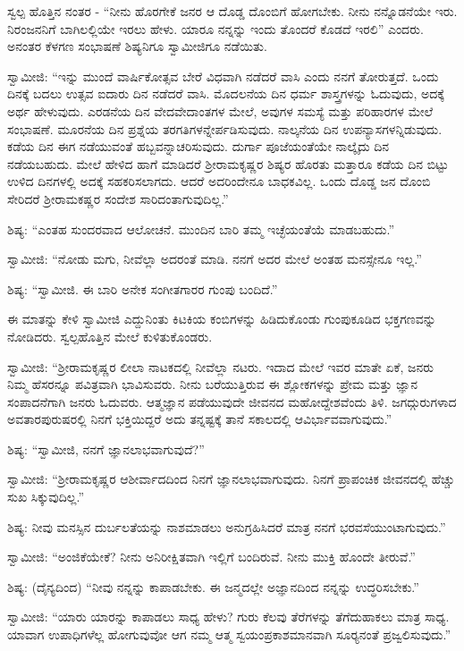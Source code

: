  ಸ್ವಲ್ಪ ಹೊತ್ತಿನ ನಂತರ - “ನೀನು ಹೊರಗೇಕೆ ಜನರ ಆ ದೊಡ್ಡ ದೊಂಬಿಗೆ ಹೋಗಬೇಕು. ನೀನು ನನ್ನೊಡನೆಯೇ ಇರು. ನಿರಂಜನನಿಗೆ ಬಾಗಿಲಲ್ಲಿಯೇ ಇರಲು ಹೇಳು. ಯಾರೂ ನನ್ನನ್ನು ಇಂದು ತೊಂದರೆ ಕೊಡದೆ ಇರಲಿ” ಎಂದರು. ಅನಂತರ ಕೆಳಗಣ ಸಂಭಾಷಣೆ ಶಿಷ್ಯನಿಗೂ ಸ್ವಾಮೀಜಿಗೂ ನಡೆಯಿತು. 

 ಸ್ವಾಮೀಜಿ: “ಇನ್ನು ಮುಂದೆ ವಾರ್ಷಿಕೋತ್ಸವ ಬೇರೆ ವಿಧವಾಗಿ ನಡೆದರೆ ವಾಸಿ ಎಂದು ನನಗೆ ತೋರುತ್ತದೆ. ಒಂದು ದಿನಕ್ಕೆ ಬದಲು ಉತ್ಸವ ಐದಾರು ದಿನ ನಡೆದರೆ ವಾಸಿ. ಮೊದಲನೆಯ ದಿನ ಧರ್ಮ ಶಾಸ್ತ್ರಗಳನ್ನು ಓದುವುದು, ಅದಕ್ಕೆ ಅರ್ಥ ಹೇಳುವುದು. ಎರಡನೆಯ ದಿನ ವೇದವೇದಾಂತಗಳ ಮೇಲೆ, ಅವುಗಳ ಸಮಸ್ಯೆ ಮತ್ತು ಪರಿಹಾರಗಳ ಮೇಲೆ ಸಂಭಾಷಣೆ. ಮೂರನೆಯ ದಿನ ಪ್ರಶ್ನೆಯ ತರಗತಿಗಳನ್ನೇರ್ಪಡಿಸುವುದು. ನಾಲ್ಕನೆಯ ದಿನ ಉಪನ್ಯಾಸಗಳನ್ನಿಡುವುದು. ಕಡೆಯ ದಿನ ಈಗ ನಡೆಯುವಂತೆ ಹಬ್ಬವನ್ನಾಚರಿಸುವುದು. ದುರ್ಗಾ ಪೂಜೆಯಂತೆಯೇ ನಾಲ್ಕೈದು ದಿನ ನಡೆಯಬಹುದು. ಮೇಲೆ ಹೇಳಿದ ಹಾಗೆ ಮಾಡಿದರೆ ಶ‍್ರೀರಾಮಕೃಷ್ಣರ ಶಿಷ್ಯರ ಹೊರತು ಮತ್ತಾರೂ ಕಡೆಯ ದಿನ ಬಿಟ್ಟು ಉಳಿದ ದಿನಗಳಲ್ಲಿ ಅದಕ್ಕೆ ಸಹಕರಿಸಲಾಗದು. ಆದರೆ ಅದರಿಂದೇನೂ ಬಾಧಕವಿಲ್ಲ. ಒಂದು ದೊಡ್ಡ ಜನ ದೊಂಬಿ ಸೇರಿದರೆ ಶ‍್ರೀರಾಮಕಷ್ಣರ ಸಂದೇಶ ಸಾರಿದಂತಾಗುವುದಿಲ್ಲ.” 

 ಶಿಷ್ಯ: “ಎಂತಹ ಸುಂದರವಾದ ಆಲೋಚನೆ. ಮುಂದಿನ ಬಾರಿ ತಮ್ಮ ಇಚ್ಛೆಯಂತೆಯೆ ಮಾಡಬಹುದು.” 

 ಸ್ವಾಮೀಜಿ: “ನೋಡು ಮಗು, ನೀವೆಲ್ಲಾ ಅದರಂತೆ ಮಾಡಿ. ನನಗೆ ಅದರ ಮೇಲೆ ಅಂತಹ ಮನಸ್ಸೇನೂ ಇಲ್ಲ.” 

 ಶಿಷ್ಯ: “ಸ್ವಾಮೀಜಿ. ಈ ಬಾರಿ ಅನೇಕ ಸಂಗೀತಗಾರರ ಗುಂಪು ಬಂದಿದೆ.” 

 ಈ ಮಾತನ್ನು ಕೇಳಿ ಸ್ವಾಮೀಜಿ ಎದ್ದುನಿಂತು ಕಿಟಕಿಯ ಕಂಬಿಗಳನ್ನು ಹಿಡಿದುಕೊಂಡು ಗುಂಪುಕೂಡಿದ ಭಕ್ತಗಣವನ್ನು ನೋಡಿದರು. ಸ್ವಲ್ಪಹೊತ್ತಿನ ಮೇಲೆ ಕುಳಿತುಕೊಂಡರು. 

 ಸ್ವಾಮೀಜಿ: “ಶ‍್ರೀರಾಮಕೃಷ್ಣರ ಲೀಲಾ ನಾಟಕದಲ್ಲಿ ನೀವೆಲ್ಲಾ ನಟರು. ಇದಾದ ಮೇಲೆ ಇವರ ಮಾತೇ ಏಕೆ, ಜನರು ನಿಮ್ಮ ಹೆಸರನ್ನೂ ಪವಿತ್ರವಾಗಿ ಭಾವಿಸುವರು. ನೀನು ಬರೆಯುತ್ತಿರುವ ಈ ಶ್ಲೋಕಗಳನ್ನು ಪ್ರೇಮ ಮತ್ತು ಜ್ಞಾನ ಸಂಪಾದನೆಗಾಗಿ ಜನರು ಓದುವರು. ಆತ್ಮಜ್ಞಾನ ಪಡೆಯುವುದೇ ಜೀವನದ ಮಹೋದ್ದೇಶವೆಂದು ತಿಳಿ. ಜಗದ್ಗುರುಗಳಾದ ಅವತಾರಪುರುಷರಲ್ಲಿ ನಿನಗೆ ಭಕ್ತಿಯಿದ್ದರೆ ಅದು ತನ್ನಷ್ಟಕ್ಕೆ ತಾನೆ ಸಕಾಲದಲ್ಲಿ ಆವಿರ್ಭಾವವಾಗುವುದು.” 

 ಶಿಷ್ಯ: “ಸ್ವಾಮೀಜಿ, ನನಗೆ ಜ್ಞಾನಲಾಭವಾಗುವುದೆ?” 

 ಸ್ವಾಮೀಜಿ: “ಶ‍್ರೀರಾಮಕೃಷ್ಣರ ಆಶೀರ್ವಾದದಿಂದ ನಿನಗೆ ಜ್ಞಾನಲಾಭವಾಗುವುದು. ನಿನಗೆ ಪ್ರಾಪಂಚಿಕ ಜೀವನದಲ್ಲಿ ಹೆಚ್ಚು ಸುಖ ಸಿಕ್ಕುವುದಿಲ್ಲ.” 

 ಶಿಷ್ಯ: ನೀವು ಮನಸ್ಸಿನ ದುರ್ಬಲತೆಯನ್ನು ನಾಶಮಾಡಲು ಅನುಗ್ರಹಿಸಿದರೆ ಮಾತ್ರ ನನಗೆ ಭರವಸೆಯುಂಟಾಗುವುದು.” 

\newpage

 ಸ್ವಾಮೀಜಿ: “ಅಂಜಿಕೆಯೇಕೆ? ನೀನು ಅನಿರೀಕ್ಷಿತವಾಗಿ ಇಲ್ಲಿಗೆ ಬಂದಿರುವೆ. ನೀನು ಮುಕ್ತಿ ಹೊಂದೇ ತೀರುವೆ.” 

 ಶಿಷ್ಯ: (ದೈನ್ಯದಿಂದ) “ನೀವು ನನ್ನನ್ನು ಕಾಪಾಡಬೇಕು. ಈ ಜನ್ಮದಲ್ಲೇ ಅಜ್ಞಾನದಿಂದ ನನ್ನನ್ನು ಉದ್ಧರಿಸಬೇಕು.” 

 ಸ್ವಾಮೀಜಿ: “ಯಾರು ಯಾರನ್ನು ಕಾಪಾಡಲು ಸಾಧ್ಯ ಹೇಳು? ಗುರು ಕೆಲವು ತೆರೆಗಳನ್ನು ತೆಗೆದುಹಾಕಲು ಮಾತ್ರ ಸಾಧ್ಯ. ಯಾವಾಗ ಉಪಾಧಿಗಳೆಲ್ಲ ಹೋಗುವುವೋ ಆಗ ನಮ್ಮ ಆತ್ಮ ಸ್ವಯಂಪ್ರಕಾಶಮಾನವಾಗಿ ಸೂರ‍್ಯನಂತೆ ಪ್ರಜ್ವಲಿಸುವುದು.” 

